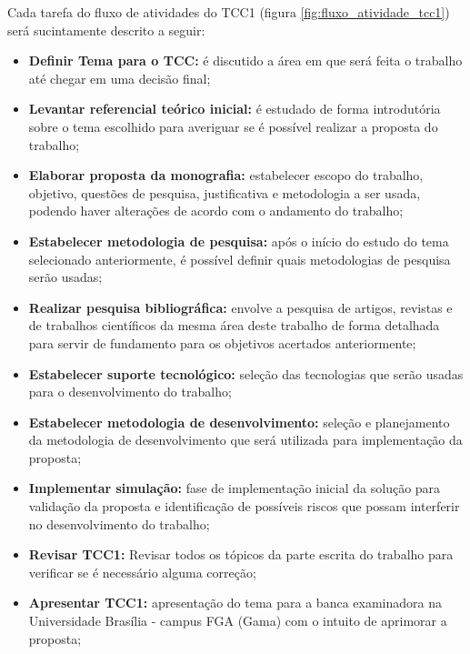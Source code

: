 Cada tarefa do fluxo de atividades do TCC1 (figura \ref{fig:fluxo_atividade_tcc1}) será sucintamente descrito a seguir:

\begin{itemize}
    \item \textbf{Definir Tema para o TCC:} é discutido a área em que será feita o trabalho até chegar em uma decisão final;

    \item \textbf{Levantar referencial teórico inicial:} é estudado de forma introdutória sobre o tema escolhido para averiguar se é possível realizar a proposta do trabalho;

    \item \textbf{Elaborar proposta da monografia:} estabelecer escopo do trabalho, objetivo, questões de pesquisa, justificativa e metodologia a ser usada, podendo haver alterações de acordo com o andamento do trabalho;

    \item \textbf{Estabelecer metodologia de pesquisa:} após o início do estudo do tema selecionado anteriormente, é possível definir quais metodologias de pesquisa serão usadas;

    \item \textbf{Realizar pesquisa bibliográfica:} envolve a pesquisa de artigos, revistas e de trabalhos científicos da mesma área deste trabalho de forma detalhada para servir de fundamento para os objetivos acertados anteriormente;

    \item \textbf{Estabelecer suporte tecnológico:} seleção das tecnologias que serão usadas para o desenvolvimento do trabalho;

    \item \textbf{Estabelecer metodologia de desenvolvimento:} seleção e planejamento da metodologia de desenvolvimento que será utilizada para implementação da proposta;

    \item \textbf{Implementar simulação:} fase de implementação inicial da solução para validação da proposta e identificação de possíveis riscos que possam interferir no desenvolvimento do trabalho;

    \item \textbf{Revisar TCC1:} Revisar todos os tópicos da parte escrita do trabalho para verificar se é necessário alguma correção;

    \item \textbf{Apresentar TCC1:} apresentação do tema para a banca examinadora na Universidade Brasília - campus FGA (Gama) com o intuito de aprimorar a proposta;

\end{itemize}

